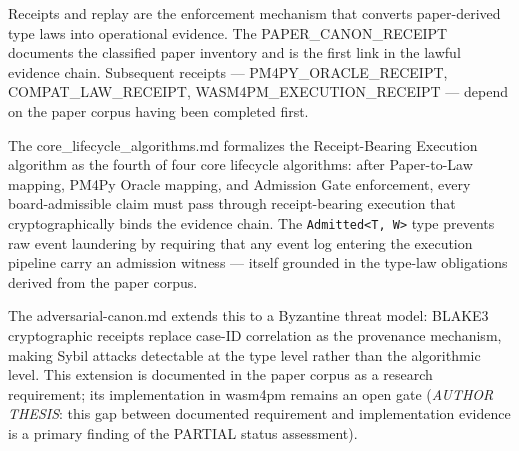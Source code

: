 Receipts and replay are the enforcement mechanism that converts paper-derived
type laws into operational evidence. The PAPER\_CANON\_RECEIPT documents the
classified paper inventory and is the first link in the lawful evidence chain.
Subsequent receipts --- PM4PY\_ORACLE\_RECEIPT, COMPAT\_LAW\_RECEIPT,
WASM4PM\_EXECUTION\_RECEIPT --- depend on the paper corpus having been
completed first.

The core\_lifecycle\_algorithms.md formalizes the Receipt-Bearing Execution
algorithm as the fourth of four core lifecycle algorithms: after Paper-to-Law
mapping, PM4Py Oracle mapping, and Admission Gate enforcement, every
board-admissible claim must pass through receipt-bearing execution that
cryptographically binds the evidence chain. The \texttt{Admitted<T, W>} type
prevents raw event laundering by requiring that any event log entering the
execution pipeline carry an admission witness --- itself grounded in the
type-law obligations derived from the paper corpus.

The adversarial-canon.md extends this to a Byzantine threat model: BLAKE3
cryptographic receipts replace case-ID correlation as the provenance mechanism,
making Sybil attacks detectable at the type level rather than the algorithmic
level. This extension is documented in the paper corpus as a research
requirement; its implementation in wasm4pm remains an open gate
(\textit{AUTHOR THESIS}: this gap between documented requirement and
implementation evidence is a primary finding of the PARTIAL status assessment).
